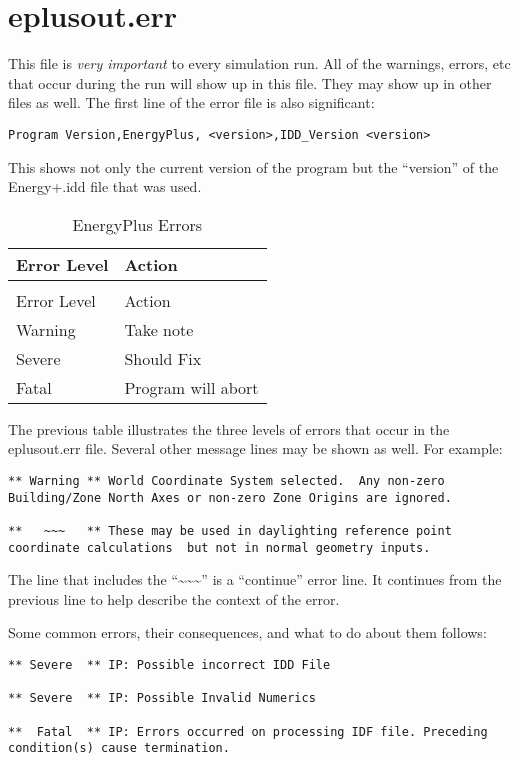 \section{eplusout.err}

This file is \emph{very important} to every simulation run. All of the warnings, errors, etc that occur during the run will show up in this file. They may show up in other files as well. The first line of the error file is also significant:

\begin{lstlisting}
Program Version,EnergyPlus, <version>,IDD_Version <version>
\end{lstlisting}

This shows not only the current version of the program but the ``version'' of the Energy+.idd file that was used.

\begin{longtable}[c]{@{}ll@{}}
\caption{EnergyPlus Errors \label{table:energyplus-errors}} \tabularnewline
\toprule 
Error Level & Action \tabularnewline
\midrule
\endfirsthead

\caption[]{EnergyPlus Errors} \tabularnewline
\toprule 
Error Level & Action \tabularnewline
\midrule
\endhead

Warning & Take note \tabularnewline
Severe & Should Fix \tabularnewline
Fatal & Program will abort \tabularnewline
\bottomrule
\end{longtable}

The previous table illustrates the three levels of errors that occur in the eplusout.err file. Several other message lines may be shown as well. For example:

\begin{lstlisting}
** Warning ** World Coordinate System selected.  Any non-zero Building/Zone North Axes or non-zero Zone Origins are ignored.

**   ~~~   ** These may be used in daylighting reference point coordinate calculations  but not in normal geometry inputs.
\end{lstlisting}

The line that includes the ``\~{}\~{}\~{}'' is a ``continue'' error line. It continues from the previous line to help describe the context of the error.

Some common errors, their consequences, and what to do about them follows:

\begin{lstlisting}
** Severe  ** IP: Possible incorrect IDD File

** Severe  ** IP: Possible Invalid Numerics

**  Fatal  ** IP: Errors occurred on processing IDF file. Preceding condition(s) cause termination.
\end{lstlisting}

